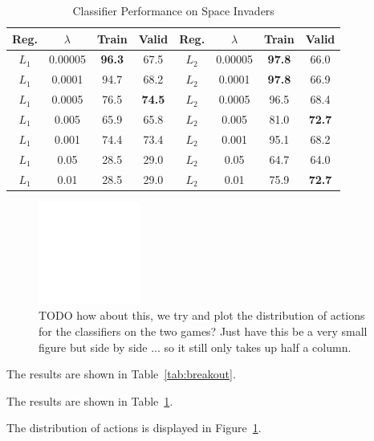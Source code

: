 \documentclass[letterpaper, 10pt, conference]{ieeeconf}
\begin{document}
\begin{table}[!t]
\renewcommand{\arraystretch}{1.3}
\caption{Classifier Performance on Space Invaders}
\label{tab:space_invaders}
\centering
\begin{tabular}{c c c c | c c c c}
\hline
Reg.  & $\lambda$ & Train & Valid & Reg.  & $\lambda$ & Train & Valid \\
\hline
$L_1$ & 0.00005   & \textbf{96.3}  & 67.5  & $L_2$ & 0.00005   & \textbf{97.8}  & 66.0 \\
$L_1$ & 0.0001    & 94.7  & 68.2  & $L_2$ & 0.0001    & \textbf{97.8}  & 66.9 \\
$L_1$ & 0.0005    & 76.5  & \textbf{74.5}  & $L_2$ & 0.0005    & 96.5  & 68.4 \\
$L_1$ & 0.005     & 65.9  & 65.8  & $L_2$ & 0.005     & 81.0  & \textbf{72.7} \\
$L_1$ & 0.001     & 74.4  & 73.4  & $L_2$ & 0.001     & 95.1  & 68.2 \\
$L_1$ & 0.05      & 28.5  & 29.0  & $L_2$ & 0.05      & 64.7  & 64.0 \\
$L_1$ & 0.01      & 28.5  & 29.0  & $L_2$ & 0.01      & 75.9  & \textbf{72.7} \\
\hline
\end{tabular}
\end{table}

\begin{figure}[t]
\centering
\includegraphics[width=0.30\textwidth]{figures/empty.png}
\caption{\footnotesize
TODO how about this, we try and plot the distribution of actions for the
classifiers on the two games? Just have this be a very small figure but side by
side ... so it still only takes up half a column.
}
\label{fig:action_distribution}
\end{figure}

The results are shown in Table~\ref{tab:breakout}.

The results are shown in Table~\ref{tab:space_invaders}.

The distribution of actions is displayed in Figure~\ref{fig:action_distribution}.
\end{document}
